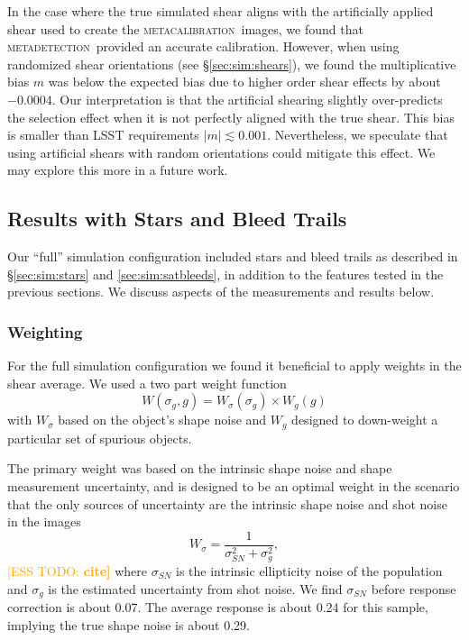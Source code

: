 \documentclass[twocolumn,twocolappendix,astrosym]{openjournal}
\newcommand{\esstodo}[1]{\textcolor{orange}{[ESS TODO: \bf #1]}}
\newcommand{\mcal}{\textsc{metacalibration}}
\newcommand{\mdet}{\textsc{metadetection}}
\begin{document}
In the case where the true simulated shear aligns with the artificially applied
shear used to create the \mcal\ images, we found that \mdet\ provided an
accurate calibration.  However, when using randomized shear orientations (see
\S \ref{sec:sim:shears}), we found the multiplicative bias $m$ was below the
expected bias due to higher order shear effects by about $-0.0004$.  Our
interpretation is that the artificial shearing slightly over-predicts the
selection effect when it is not perfectly aligned with the true shear.  This
bias is smaller than LSST requirements $|m| \lesssim 0.001$.  Nevertheless, we
speculate that using artificial shears with random orientations could mitigate
this effect.  We may explore this more in a future work.

\subsection{Results with Stars and Bleed Trails} \label{sec:results:full}

Our ``full'' simulation configuration included stars and bleed trails as
described in \S \ref{sec:sim:stars} and \ref{sec:sim:satbleeds}, in addition to
the features tested in the previous sections.  We discuss aspects of the
measurements and results below.

\subsubsection{Weighting}

For the full simulation configuration we found it beneficial to apply weights
in the shear average.  We used a two part weight function
\begin{equation}
    W(\sigma_g, g) = W_\sigma (\sigma_g) \times W_g(g)
\end{equation}
with $W_\sigma$ based on the object's shape noise and $W_g$ designed to
down-weight a particular set of spurious objects.

The primary weight was based on the intrinsic shape noise and shape
measurement uncertainty, and is designed to be an optimal weight in the
scenario that the only sources of uncertainty are the intrinsic shape noise 
and shot noise in the images
\begin{equation}
    W_\sigma = \frac{1}{\sigma_{SN}^2 + \sigma_g^2},
\end{equation}
\esstodo{cite}
where $\sigma_{SN}$ is the intrinsic ellipticity noise of the population and
$\sigma_g$ is the estimated uncertainty from shot noise.  We find $\sigma_{SN}$
before response correction is about 0.07.  The average response is about 0.24
for this sample, implying the true shape noise is about 0.29.
\end{document}
